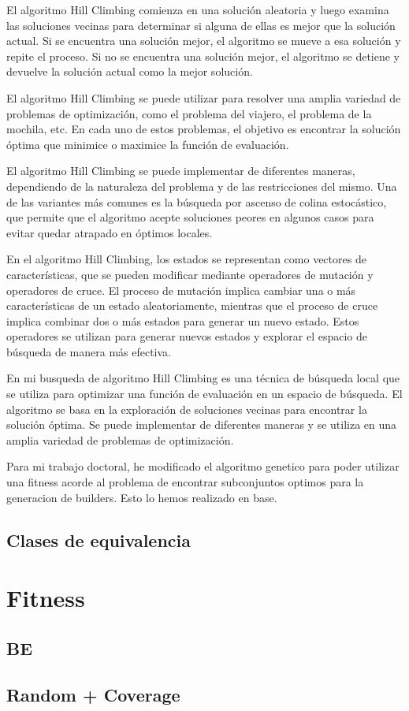 El algoritmo Hill Climbing comienza en una solución aleatoria y luego examina las soluciones vecinas para determinar si alguna de ellas es mejor que la solución actual. Si se encuentra una solución mejor, el algoritmo se mueve a esa solución y repite el proceso. Si no se encuentra una solución mejor, el algoritmo se detiene y devuelve la solución actual como la mejor solución.

El algoritmo Hill Climbing se puede utilizar para resolver una amplia variedad de problemas de optimización, como el problema del viajero, el problema de la mochila, etc. En cada uno de estos problemas, el objetivo es encontrar la solución óptima que minimice o maximice la función de evaluación.

El algoritmo Hill Climbing se puede implementar de diferentes maneras, dependiendo de la naturaleza del problema y de las restricciones del mismo. Una de las variantes más comunes es la búsqueda por ascenso de colina estocástico, que permite que el algoritmo acepte soluciones peores en algunos casos para evitar quedar atrapado en óptimos locales.

En el algoritmo Hill Climbing, los estados se representan como vectores de características, que se pueden modificar mediante operadores de mutación y operadores de cruce. El proceso de mutación implica cambiar una o más características de un estado aleatoriamente, mientras que el proceso de cruce implica combinar dos o más estados para generar un nuevo estado. Estos operadores se utilizan para generar nuevos estados y explorar el espacio de búsqueda de manera más efectiva.

En mi busqueda de algoritmo Hill Climbing es una técnica de búsqueda local que se utiliza para optimizar una función de evaluación en un espacio de búsqueda. El algoritmo se basa en la exploración de soluciones vecinas para encontrar la solución óptima. Se puede implementar de diferentes maneras y se utiliza en una amplia variedad de problemas de optimización.


Para mi trabajo doctoral, he modificado el algoritmo genetico para poder utilizar una fitness acorde al problema de encontrar subconjuntos optimos para la generacion de builders.
Esto lo hemos realizado en base.

\subsection{Clases de equivalencia}
\label{alg:approachCE}
\section{Fitness}
\subsection{BE}

\subsection{Random + Coverage}
